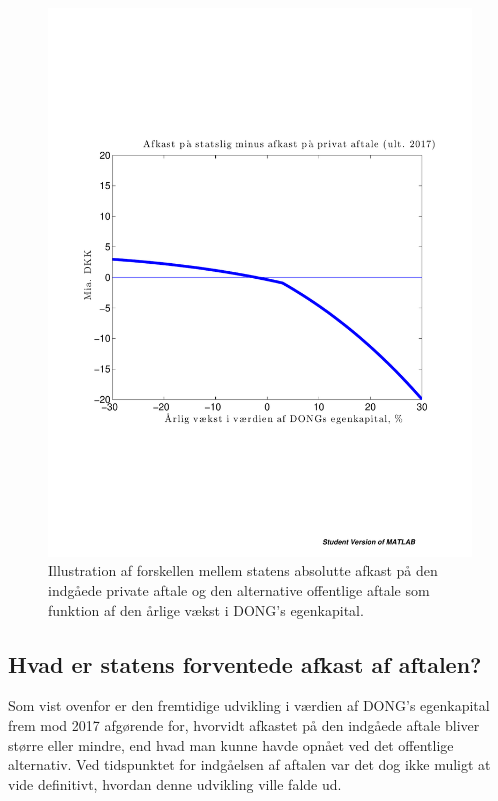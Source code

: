 \documentclass{article}
\begin{document}
\begin{figure}[t]
\centerline{\includegraphics[scale=0.6, trim=0mm 60mm 0mm 60mm, clip]{../matlab/figs/private_less_public_deal.pdf}}
\caption{Illustration af forskellen mellem statens absolutte afkast p\aa{} den indg\aa{}ede private aftale og den alternative offentlige aftale som funktion af den \aa{}rlige v\ae{}kst i DONG's egenkapital. }
\label{fig:comp}
\end{figure}


\subsection{Hvad er statens forventede afkast af aftalen?}

Som vist ovenfor er den fremtidige udvikling i værdien af DONG's egenkapital frem mod 2017 afgørende for, hvorvidt afkastet på den indgåede aftale bliver større eller mindre, end hvad man kunne havde opnået ved det offentlige alternativ. Ved tidspunktet for indgåelsen af aftalen var det dog ikke muligt at vide definitivt, hvordan denne udvikling ville falde ud. 
\end{document}
